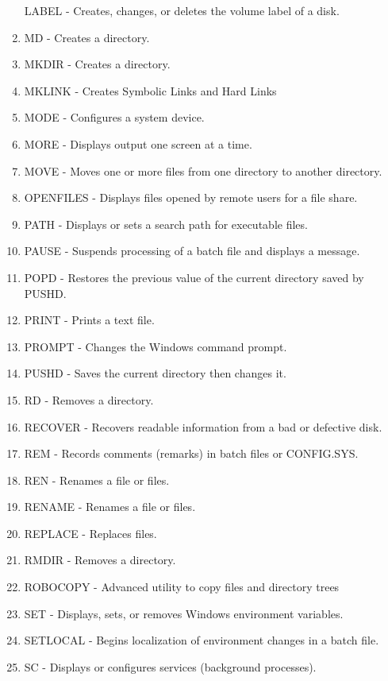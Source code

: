\documentclass[11pt,a4paper,twoside]{article}
\begin{document}
\begin{enumerate}
LABEL          	-	Creates, changes, or deletes the volume label of a disk.
\item MD             	-	Creates a directory.
\item MKDIR          	-	Creates a directory.
\item MKLINK         	-	Creates Symbolic Links and Hard Links
\item MODE           	-	Configures a system device.
\item MORE           	-	Displays output one screen at a time.
\item MOVE           	-	Moves one or more files from one directory to another directory.
\item OPENFILES      	-	Displays files opened by remote users for a file share.
\item PATH           	-	Displays or sets a search path for executable files.
\item PAUSE          	-	Suspends processing of a batch file and displays a message.
\item POPD           	-	Restores the previous value of the current directory saved by PUSHD.
\item PRINT          	-	Prints a text file.
\item PROMPT         	-	Changes the Windows command prompt.
\item PUSHD          	-	Saves the current directory then changes it.
\item RD             	-	Removes a directory.
\item RECOVER        	-	Recovers readable information from a bad or defective disk.
\item REM            	-	Records comments (remarks) in batch files or CONFIG.SYS.
\item REN            	-	Renames a file or files.
\item RENAME         	-	Renames a file or files.
\item REPLACE        	-	Replaces files.
\item RMDIR          	-	Removes a directory.
\item ROBOCOPY       	-	Advanced utility to copy files and directory trees
\item SET            	-	Displays, sets, or removes Windows environment variables.
\item SETLOCAL       	-	Begins localization of environment changes in a batch file.
\item SC             	-	Displays or configures services (background processes).

\end{enumerate}
\end{document}

